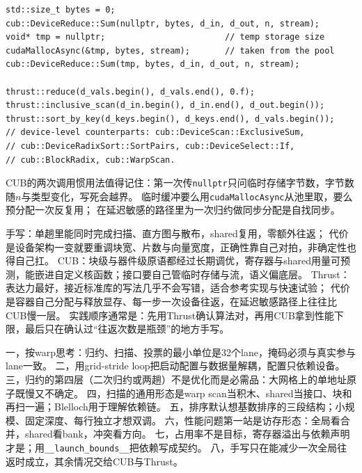 \documentclass[12pt,a4paper,fontset=fandol]{ctexbook}
\newcommand{\Tp}[1]{\texttt{#1}}
\begin{document}
\begin{lstlisting}[style=cppstyle,caption={三种写法：CUB 两次调用与 Thrust 一行}]
std::size_t bytes = 0;
cub::DeviceReduce::Sum(nullptr, bytes, d_in, d_out, n, stream);
void* tmp = nullptr;                        // temp storage size
cudaMallocAsync(&tmp, bytes, stream);       // taken from the pool
cub::DeviceReduce::Sum(tmp, bytes, d_in, d_out, n, stream);

thrust::reduce(d_vals.begin(), d_vals.end(), 0.f);
thrust::inclusive_scan(d_in.begin(), d_in.end(), d_out.begin());
thrust::sort_by_key(d_keys.begin(), d_keys.end(), d_vals.begin());
// device-level counterparts: cub::DeviceScan::ExclusiveSum,
// cub::DeviceRadixSort::SortPairs, cub::DeviceSelect::If,
// cub::BlockRadix, cub::WarpScan.
\end{lstlisting}

CUB的两次调用惯用法值得记住：第一次传\Tp{nullptr}只问临时存储字节数，字节数随$n$与类型变化，写死会越界。
临时缓冲要么用\Tp{cudaMallocAsync}从池里取，要么预分配一次反复用；
在延迟敏感的路径里为一次归约做同步分配是自找同步。

\begin{compare}[title={手写核函数、CUB与Thrust}]
手写：单趟里能同时完成扫描、直方图与散布，shared复用，零额外往返；
代价是设备架构一变就要重调块宽、片数与向量宽度，正确性靠自己对拍，非确定性也得自己扛。
CUB：块级与器件级原语都经过长期调优，寄存器与shared用量可预测，能嵌进自定义核函数；接口要自己管临时存储与流，语义偏底层。
Thrust：表达力最好，接近标准库的写法几乎不会写错，适合参考实现与快速试验；
代价是容器自己分配与释放显存、每一步一次设备往返，在延迟敏感路径上往往比CUB慢一层。
实践顺序通常是：先用Thrust确认算法对，再用CUB拿到性能下限，最后只在确认过``往返次数是瓶颈''的地方手写。
\end{compare}

\begin{guideline}[title={本章要点}]
一，按warp思考：归约、扫描、投票的最小单位是32个lane，掩码必须与真实参与lane一致。
二，用grid-stride loop把启动配置与数据量解耦，配置只依赖设备。
三，归约的第四层（二次归约或两趟）不是优化而是必需品：大网格上的单地址原子既慢又不确定。
四，扫描的通用形态是warp scan当积木、shared当接口、块和再扫一遍；Blelloch用于理解依赖链。
五，排序默认想基数排序的三段结构；小规模、固定深度、每行独立才想双调。
六，性能问题第一站是访存形态：全局看合并，shared看bank，冲突看方向。
七，占用率不是目标，寄存器溢出与依赖声明才是；用\Tp{\_\_launch\_bounds\_\_}把依赖写成契约。
八，手写只在能减少一次全局往返时成立，其余情况交给CUB与Thrust。
\end{guideline}
\end{document}
